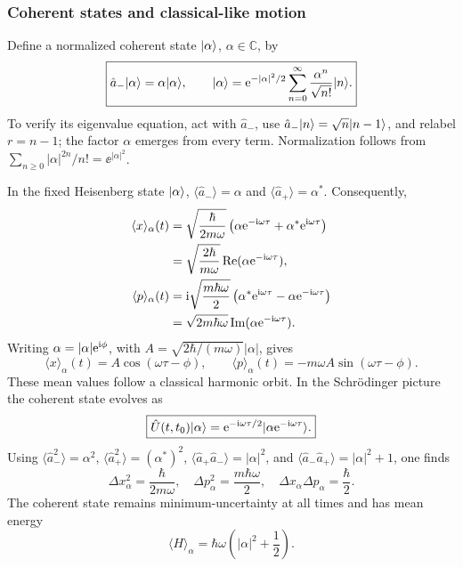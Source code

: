 \documentclass[11pt,a4paper]{article}
\newcommand{\avg}[1]{\langle #1\rangle}\newcommand{\Sch}{Schr\"odinger}
\begin{document}
\subsubsection{Coherent states and classical-like motion}
Define a normalized coherent state \(|\alpha\rangle\), \(\alpha\in\mathbb C\), by
\begin{equation}\boxed{\hat a_-|\alpha\rangle=\alpha|\alpha\rangle,\qquad|\alpha\rangle=\mathrm{e}^{-|\alpha|^2/2}\sum_{n=0}^{\infty}\frac{\alpha^n}{\sqrt{n!}}|n\rangle.}\end{equation}
To verify its eigenvalue equation, act with \(\hat a_-\), use \(\hat a_-|n\rangle=\sqrt n|n-1\rangle\), and relabel \(r=n-1\); the factor \(\alpha\) emerges from every term. Normalization follows from \(\sum_{n\ge0}|\alpha|^{2n}/n!=\ee^{|\alpha|^2}\).

In the fixed Heisenberg state \(|\alpha\rangle\), \(\avg{\hat a_-}=\alpha\) and \(\avg{\hat a_+}=\alpha^*\). Consequently,
\begin{align}
\avg x_\alpha(t)&=\sqrt{\frac{\hbar}{2m\omega}}\left(\alpha\ee^{-\iu\omega\tau}+\alpha^*\ee^{\iu\omega\tau}\right)\\
&=\sqrt{\frac{2\hbar}{m\omega}}\operatorname{Re}(\alpha\ee^{-\iu\omega\tau}),\\
\avg p_\alpha(t)&=\iu\sqrt{\frac{m\hbar\omega}{2}}\left(\alpha^*\ee^{\iu\omega\tau}-\alpha\ee^{-\iu\omega\tau}\right)\\
&=\sqrt{2m\hbar\omega}\operatorname{Im}(\alpha\ee^{-\iu\omega\tau}).
\end{align}
Writing \(\alpha=|\alpha|\mathrm{e}^{\mathrm{i}\phi}\), with \(A=\sqrt{2\hbar/(m\omega)}|\alpha|\), gives
\begin{equation}\boxed{\avg x_\alpha(t)=A\cos(\omega\tau-\phi),\qquad\avg p_\alpha(t)=-m\omega A\sin(\omega\tau-\phi).}\end{equation}
These mean values follow a classical harmonic orbit. In the Schr\"odinger picture the coherent state evolves as
\begin{equation}\boxed{\hat U(t,t_0)|\alpha\rangle=\mathrm{e}^{-\mathrm{i}\omega\tau/2}|\alpha\mathrm{e}^{-\mathrm{i}\omega\tau}\rangle.}\end{equation}
Using \(\avg{\hat a_-^2}=\alpha^2\), \(\avg{\hat a_+^2}=(\alpha^*)^2\), \(\avg{\hat a_+\hat a_-}=|\alpha|^2\), and \(\avg{\hat a_-\hat a_+}=|\alpha|^2+1\), one finds
\begin{equation}\boxed{\Delta x_\alpha^2=\frac{\hbar}{2m\omega},\quad\Delta p_\alpha^2=\frac{m\hbar\omega}{2},\quad\Delta x_\alpha\Delta p_\alpha=\frac\hbar2.}\end{equation}
The coherent state remains minimum-uncertainty at all times and has mean energy
\begin{equation}\boxed{\avg H_\alpha=\hbar\omega\left(|\alpha|^2+\frac12\right).}\end{equation}
\end{document}

